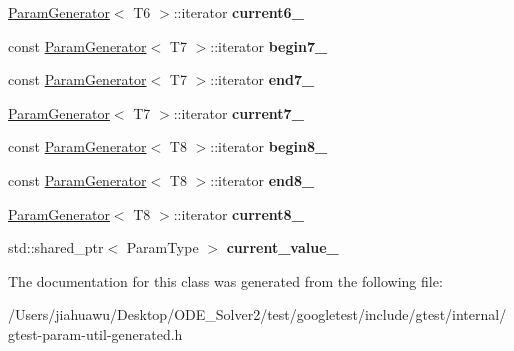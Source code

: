 \begin{DoxyCompactItemize}
\mbox{\hyperlink{classtesting_1_1internal_1_1_param_generator}{Param\+Generator}}$<$ T6 $>$\+::iterator {\bfseries current6\+\_\+}
\item 
\mbox{\label{classtesting_1_1internal_1_1_cartesian_product_generator8_1_1_iterator_aad64e4a3b21cba0ff12e6db9f2093923}} 
const \mbox{\hyperlink{classtesting_1_1internal_1_1_param_generator}{Param\+Generator}}$<$ T7 $>$\+::iterator {\bfseries begin7\+\_\+}
\item 
\mbox{\label{classtesting_1_1internal_1_1_cartesian_product_generator8_1_1_iterator_a7c62a0785a771015893a1b2e4e56aaf2}} 
const \mbox{\hyperlink{classtesting_1_1internal_1_1_param_generator}{Param\+Generator}}$<$ T7 $>$\+::iterator {\bfseries end7\+\_\+}
\item 
\mbox{\label{classtesting_1_1internal_1_1_cartesian_product_generator8_1_1_iterator_ab7d2f4adc0df24a2d1777bb7586df27d}} 
\mbox{\hyperlink{classtesting_1_1internal_1_1_param_generator}{Param\+Generator}}$<$ T7 $>$\+::iterator {\bfseries current7\+\_\+}
\item 
\mbox{\label{classtesting_1_1internal_1_1_cartesian_product_generator8_1_1_iterator_aa430573514b04b82743611976775512c}} 
const \mbox{\hyperlink{classtesting_1_1internal_1_1_param_generator}{Param\+Generator}}$<$ T8 $>$\+::iterator {\bfseries begin8\+\_\+}
\item 
\mbox{\label{classtesting_1_1internal_1_1_cartesian_product_generator8_1_1_iterator_a397dad40217eafa18c48db62181483ab}} 
const \mbox{\hyperlink{classtesting_1_1internal_1_1_param_generator}{Param\+Generator}}$<$ T8 $>$\+::iterator {\bfseries end8\+\_\+}
\item 
\mbox{\label{classtesting_1_1internal_1_1_cartesian_product_generator8_1_1_iterator_a10557c4060444c94546be5f99994be0e}} 
\mbox{\hyperlink{classtesting_1_1internal_1_1_param_generator}{Param\+Generator}}$<$ T8 $>$\+::iterator {\bfseries current8\+\_\+}
\item 
\mbox{\label{classtesting_1_1internal_1_1_cartesian_product_generator8_1_1_iterator_ab094e36b311973dd7270f9dac48a8f3f}} 
std\+::shared\+\_\+ptr$<$ Param\+Type $>$ {\bfseries current\+\_\+value\+\_\+}
\end{DoxyCompactItemize}


The documentation for this class was generated from the following file\+:\begin{DoxyCompactItemize}
\item 
/\+Users/jiahuawu/\+Desktop/\+O\+D\+E\+\_\+\+Solver2/test/googletest/include/gtest/internal/gtest-\/param-\/util-\/generated.\+h\end{DoxyCompactItemize}
